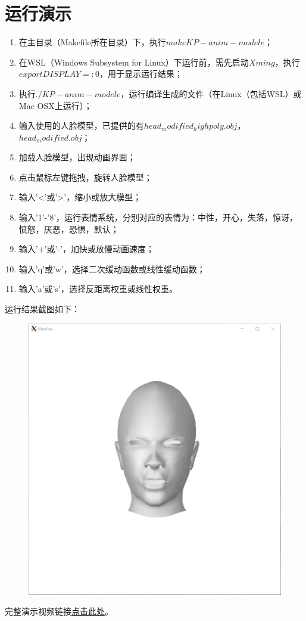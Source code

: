 \documentclass{ctexart}
\begin{document}
\section{\hei 运行演示}
\begin{enumerate}
    \item 在主目录（Makefile所在目录）下，执行$make KP-anim-modele$；
    \item 在WSL（Windows Subsystem for Linux）下运行前，需先启动$Xming$，执行$export DISPLAY=:0$，用于显示运行结果；
    \item 执行$./KP-anim-modele$，运行编译生成的文件（在Linux（包括WSL）或Mac OSX上运行）；
    \item 输入使用的人脸模型，已提供的有$head_modified_highpoly.obj$，$head_modified.obj$；
    \item 加载人脸模型，出现动画界面；
    \item 点击鼠标左键拖拽，旋转人脸模型；
    \item 输入'<'或'>'，缩小或放大模型；
    \item 输入'1'-'8'，运行表情系统，分别对应的表情为：中性，开心，失落，惊讶，愤怒，厌恶，恐惧，默认；
    \item 输入'+'或'-'，加快或放慢动画速度；
    \item 输入'q'或'w'，选择二次缓动函数或线性缓动函数；
    \item 输入'a'或's'，选择反距离权重或线性权重。
\end{enumerate}
运行结果截图如下：
\begin{figure}[htbp]
    \centering
    \includegraphics[scale=0.5]{mesh.png}

\end{figure}
\par 完整演示视频链接\href{https://www.bilibili.com/video/BV1Tq4y1s7u8}{点击此处}。
\end{document}
